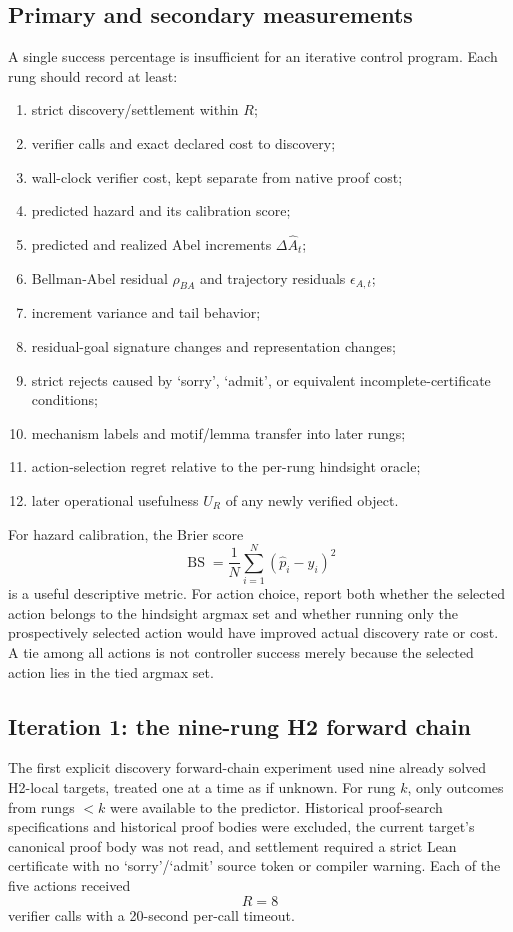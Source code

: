 \subsection{Primary and secondary measurements}
A single success percentage is insufficient for an iterative control program. Each rung should record at least:
\begin{enumerate}
\item strict discovery/settlement within $R$;
\item verifier calls and exact declared cost to discovery;
\item wall-clock verifier cost, kept separate from native proof cost;
\item predicted hazard and its calibration score;
\item predicted and realized Abel increments $\Delta\widehat A_t$;
\item Bellman-Abel residual $\rho_{BA}$ and trajectory residuals $\epsilon_{A,t}$;
\item increment variance and tail behavior;
\item residual-goal signature changes and representation changes;
\item strict rejects caused by `sorry', `admit', or equivalent incomplete-certificate conditions;
\item mechanism labels and motif/lemma transfer into later rungs;
\item action-selection regret relative to the per-rung hindsight oracle;
\item later operational usefulness $U_R$ of any newly verified object.
\end{enumerate}

For hazard calibration, the Brier score
\[
\operatorname{BS}=\frac1N\sum_{i=1}^N(\widehat p_i-y_i)^2
\]
is a useful descriptive metric. For action choice, report both whether the selected action belongs to the hindsight argmax set and whether running only the prospectively selected action would have improved actual discovery rate or cost. A tie among all actions is not controller success merely because the selected action lies in the tied argmax set.

\subsection{Iteration 1: the nine-rung H2 forward chain}
The first explicit discovery forward-chain experiment used nine already solved H2-local targets, treated one at a time as if unknown. For rung $k$, only outcomes from rungs $<k$ were available to the predictor. Historical proof-search specifications and historical proof bodies were excluded, the current target's canonical proof body was not read, and settlement required a strict Lean certificate with no `sorry'/`admit' source token or compiler warning. Each of the five actions received
\[
R=8
\]
verifier calls with a 20-second per-call timeout.

